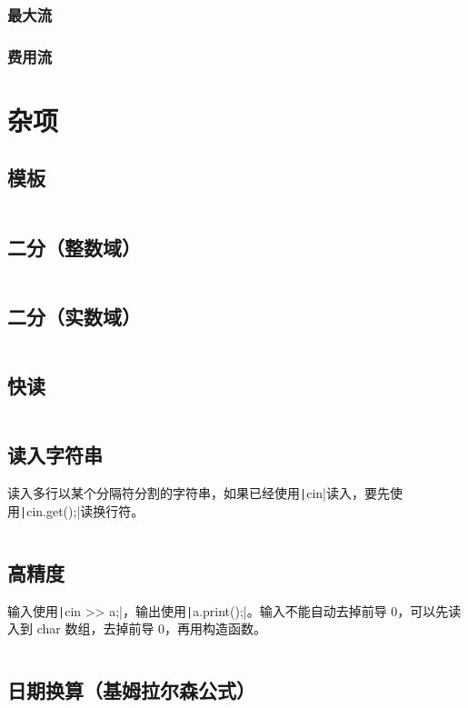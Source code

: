 \documentclass[a4paper, twoside]{article}
\begin{document}
    \subsubsection{最大流}

    \subsubsection{费用流}


\newpage
\section{杂项}
\subsection{模板}
\inputminted{cpp}{../src/杂项/模板.cpp}

\subsection{二分（整数域）}
\inputminted{cpp}{../src/杂项/二分（整数域）.cpp}

\subsection{二分（实数域）}
\inputminted{cpp}{../src/杂项/二分（实数域）.cpp}

\subsection{快读}
\inputminted{cpp}{../src/杂项/快读.cpp}

\subsection{读入字符串}
读入多行以某个分隔符分割的字符串，如果已经使用\texttt|cin|读入，要先使用\texttt|cin.get();|读换行符。
\inputminted{cpp}{../src/杂项/读入字符串.cpp}

\subsection{高精度}
输入使用\texttt|cin >> a;|，输出使用\texttt|a.print();|。输入不能自动去掉前导 0，可以先读入到 char 数组，去掉前导 0，再用构造函数。
\inputminted{cpp}{../src/杂项/高精度.cpp}

\subsection{日期换算（基姆拉尔森公式）}
\inputminted{cpp}{../src/杂项/日期换算（基姆拉尔森公式）.cpp}
\end{document}
